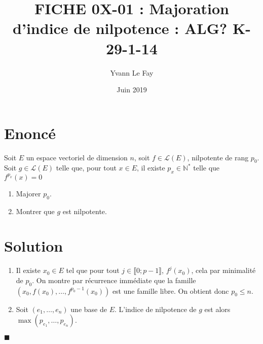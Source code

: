 \documentclass{article}
\newcommand*{\QED}{\hfill\ensuremath{\blacksquare}}%
\begin{document}
\title{FICHE 0X-01 : Majoration d'indice de nilpotence : ALG? K-29-1-14}
\author{Yvann Le Fay}
\date{Juin 2019}
\maketitle

\section*{Enoncé}
Soit $E$ un espace vectoriel de dimension $n$, soit $f\in\mathcal{L}(E)$, nilpotente de rang $p_0$. Soit $g\in\mathcal{L}(E)$ telle que, pour tout $x\in E$, il existe $p_x\in\mathbb{N}^*$ telle que $f^{p_x}(x) = 0$
\begin{enumerate}
\item Majorer $p_0$. 
\item Montrer que $g$ est nilpotente.
\end{enumerate}

\section*{Solution}
\begin{enumerate}
\item Il existe $x_0\in E$ tel que pour tout $j\in\llbracket 0;p-1\rrbracket$, $f^j(x_0)$, cela par minimalité de $p_0$. On montre par récurrence immédiate que la famille $(x_0,f(x_0),\ldots, f^{p_0-1}(x_0))$ est une famille libre. On obtient donc $p_0\leq n$.
\item Soit $(e_1,\ldots,e_n)$ une base de $E$. L'indice de nilpotence de $g$ est alors $\max (p_{e_1},\ldots, p_{e_n})$.
\end{enumerate} \QED
\end{document}
